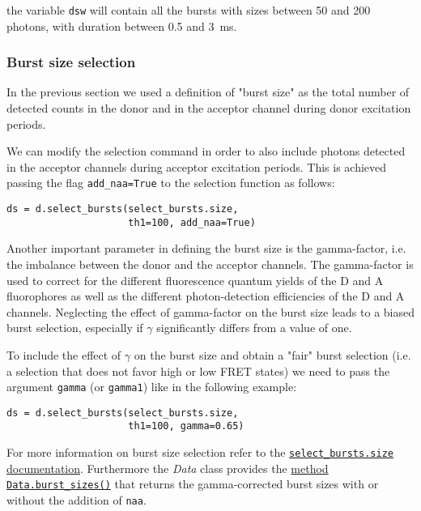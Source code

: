 the variable \verb|dsw| will contain all the bursts with sizes between 50 and
200 photons, with duration between 0.5 and 3~ms.

\subsubsection{Burst size selection}

In the previous section we used a definition of "burst size" as the total number
of detected counts in the donor and in the acceptor channel during donor
excitation periods. 

We can modify the selection command in order to also include photons detected in
the acceptor channels during acceptor excitation periods. This is achieved
passing the flag \verb|add_naa=True| to the selection function as
follows:

\begin{verbatim}
ds = d.select_bursts(select_bursts.size, 
                     th1=100, add_naa=True)
\end{verbatim}

Another important parameter in defining the burst size is the gamma-factor, i.e.
the imbalance between the donor and the acceptor channels. The gamma-factor is
used to correct for the different fluorescence quantum yields of the D and A fluorophores as well as the different photon-detection efficiencies of the D and A channels.
Neglecting the effect of gamma-factor on the burst size leads to a biased burst
selection, especially if $\gamma$ significantly differs from a value of one. 

To include the effect of $\gamma$ on the burst size and obtain a "fair" burst
selection (i.e. a selection that does not favor high or low FRET states) we
need to pass the argument \verb|gamma| (or \verb|gamma1|) like in the following
example:

\begin{verbatim}
ds = d.select_bursts(select_bursts.size, 
                     th1=100, gamma=0.65)
\end{verbatim}

For more information on burst size selection refer to the
\href{http://fretbursts.readthedocs.org/en/latest/burst_selection.html#fretbursts.select\_bursts.size}{\texttt{select\_bursts.size} documentation}. Furthermore the \textit{Data} class provides the
\href{http://fretbursts.readthedocs.org/en/latest/data_class.html#fretbursts.burstlib.Data.burst_sizes}{method \texttt{Data.burst\_sizes()}} that returns the gamma-corrected burst sizes with or
without the addition of \verb|naa|.


